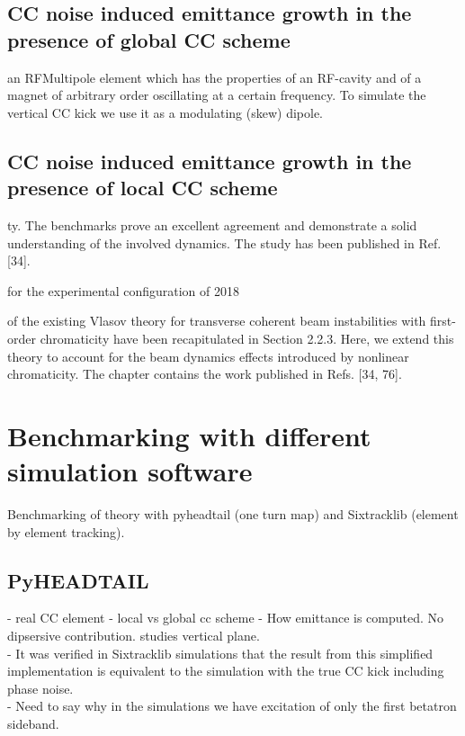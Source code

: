 

\subsection{CC noise induced emittance growth in the presence of global CC scheme}\label{subsec:global_CC}






an RFMultipole element which  has the properties of an RF-cavity and of a magnet of arbitrary order oscillating at a certain frequency. To simulate the vertical CC kick we use it as a modulating (skew) dipole.



\subsection{CC noise induced emittance growth in the presence of local CC scheme}\label{subsec:local_CC}

\newpage



ty. The
benchmarks prove an excellent agreement and demonstrate a solid understanding of the involved
dynamics. The study has been published in Ref. [34].


for the experimental configuration of 2018 

of the existing Vlasov theory for transverse coherent beam instabilities with first-order
chromaticity have been recapitulated in Section 2.2.3. Here, we extend this theory to account for the
beam dynamics effects introduced by nonlinear chromaticity. The chapter contains the work published
in Refs. [34, 76].




\section{Benchmarking with different simulation software}
Benchmarking of theory with pyheadtail (one turn map) and Sixtracklib (element by element tracking).



\subsection{PyHEADTAIL}
- real CC element
- local vs global cc scheme
- How emittance is computed. No dipsersive contribution. studies vertical plane. \\
- It was verified in Sixtracklib simulations that the result from this simplified implementation is equivalent to the simulation with the true CC kick including phase noise.\\
- Need to say why in the simulations we have excitation of only the first betatron sideband. \\
